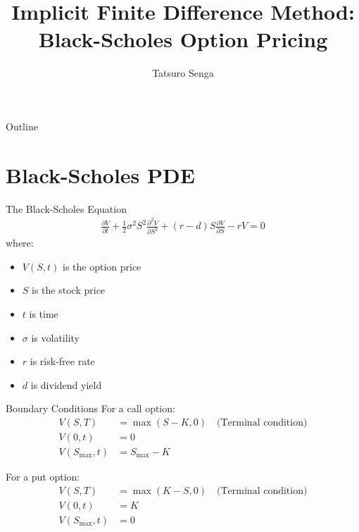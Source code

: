 \documentclass{beamer}
\title{Implicit Finite Difference Method: \\ Black-Scholes Option Pricing}
\author{Tatsuro Senga}
\date{}
\begin{document}
\begin{frame}
    \titlepage
\end{frame}

\begin{frame}{Outline}
    \tableofcontents
\end{frame}

\section{Black-Scholes PDE}

\begin{frame}{The Black-Scholes Equation}
    \begin{align*}
        \frac{\partial V}{\partial t} + \frac{1}{2}\sigma^2S^2\frac{\partial^2 V}{\partial S^2} + (r-d)S\frac{\partial V}{\partial S} - rV = 0
    \end{align*}
    where:
    \begin{itemize}
        \item $V(S,t)$ is the option price
        \item $S$ is the stock price
        \item $t$ is time
        \item $\sigma$ is volatility
        \item $r$ is risk-free rate
        \item $d$ is dividend yield
    \end{itemize}
\end{frame}

\begin{frame}{Boundary Conditions}
    For a call option:
    \begin{align*}
        V(S,T) &= \max(S-K,0) \quad \text{(Terminal condition)} \\
        V(0,t) &= 0 \\
        V(S_{\text{max}},t) &= S_{\text{max}}-K
    \end{align*}
    
    For a put option:
    \begin{align*}
        V(S,T) &= \max(K-S,0) \quad \text{(Terminal condition)} \\
        V(0,t) &= K \\
        V(S_{\text{max}},t) &= 0
    \end{align*}
\end{frame}
\end{document}
